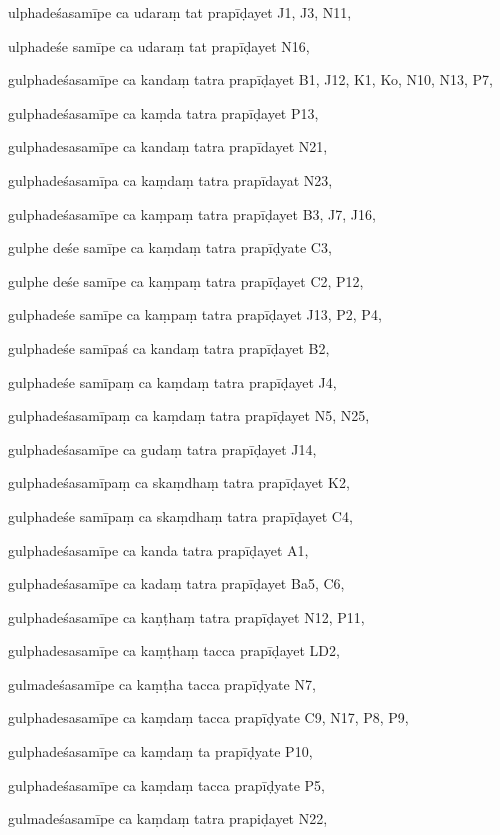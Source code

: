 \begin{marma}[hp03_064cd]


\item[ulphadeśasamīpe ca udaraṃ tat prapīḍayet] J1, J3, N11,
\item[ulphadeśe samīpe ca udaraṃ tat prapīḍayet] N16,
\item[gulphadeśasamīpe ca kandaṃ tatra prapīḍayet] B1, J12, K1, Ko, N10, N13, P7, 
\item[gulphadeśasamīpe ca kaṃda tatra prapīḍayet] P13,
\item[gulphadesasamīpe ca kandaṃ tatra prapīdayet] N21, 
\item[gulphadeśasamīpa ca kaṃdaṃ tatra prapīdayat] N23,
\item[gulphadeśasamīpe ca kaṃpaṃ tatra prapīḍayet] B3, J7, J16, 
\item[gulphe deśe samīpe ca kaṃdaṃ tatra prapīḍyate] C3,
\item[gulphe deśe samīpe ca kaṃpaṃ tatra prapīḍayet] C2, P12, 
\item[gulphadeśe samīpe ca kaṃpaṃ tatra prapīḍayet] J13, P2, P4, 
\item[gulphadeśe samīpaś ca kandaṃ tatra prapīḍayet] B2,
\item[gulphadeśe samīpaṃ ca kaṃdaṃ tatra prapīḍayet] J4,
\item[gulphadeśasamīpaṃ ca kaṃdaṃ tatra prapīḍayet] N5, N25, 
\item[gulphadeśasamīpe ca gudaṃ tatra prapīḍayet] J14,
\item[gulphadeśasamīpaṃ ca skaṃdhaṃ tatra prapīḍayet] K2,
\item[gulphadeśe samīpaṃ ca skaṃdhaṃ tatra prapīḍayet] C4, 
\item[gulphadeśasamīpe ca kanda tatra prapīḍayet] A1, 
\item[gulphadeśasamīpe ca kadaṃ tatra prapīḍayet] Ba5, C6, 
\item[gulphadeśasamīpe ca kaṇṭhaṃ tatra prapīḍayet] N12, P11, 
\item[gulphadesasamīpe ca kaṃṭhaṃ tacca prapīḍayet] LD2,
\item[gulmadeśasamīpe ca kaṃṭha tacca prapīḍyate] N7,
\item[gulphadesasamīpe ca kaṃdaṃ tacca prapīḍyate] C9, N17, P8, P9, 
\item[gulphadeśasamīpe ca kaṃdaṃ ta prapīḍyate] P10,
\item[gulphadeśasamīpe ca kaṃdaṃ tacca prapīḍyate] P5,
\item[gulmadeśasamīpe ca kaṃdaṃ tatra prapiḍayet] N22,

\end{marma}
